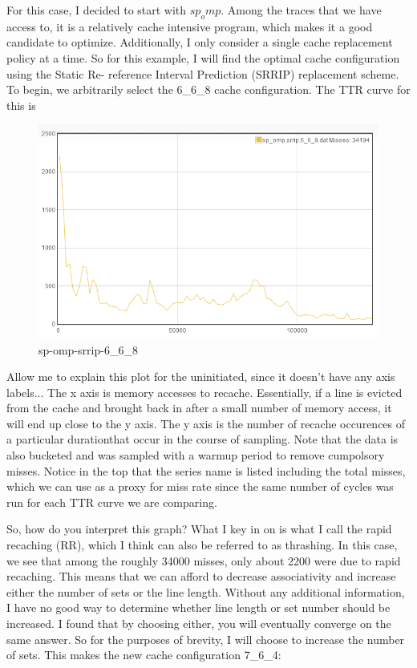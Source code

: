 For this case, I decided to start with $sp_omp$. Among the traces that we have access to, it is a relatively cache intensive program, which makes it a good candidate to optimize. Additionally, I only consider a single cache replacement policy at a time. So for this example, I will find the optimal cache configuration using the Static Re- reference Interval Prediction (SRRIP) replacement scheme. To begin, we arbitrarily select the 
6\_6\_8 
cache configuration. The TTR curve for this is

\begin{figure}
\begin{center}
\includegraphics[width={0.9\columnwidth}]{images/sp_omp-srrip-6_6_8}
\end{center}
\caption{sp-omp-srrip-6\_6\_8}
\label{6_6_8}
\end{figure}

Allow me to explain this plot for the uninitiated, since it doesn't have any axis labels... The x axis is memory accesses to recache. Essentially, if a line is evicted from the cache and brought back in after a small number of memory access, it will end up close to the y axis. The y axis is the number of recache occurences of a particular durationthat occur in the course of sampling. Note that the data is also bucketed and was sampled with a warmup period to remove cumpolsory misses. Notice in the top that the series name is listed including the total misses, which we can use as a proxy for miss rate since the same number of cycles was run for each TTR curve we are comparing.

So, how do you interpret this graph? What I key in on is what I call the rapid recaching (RR), which I think can also be referred to as thrashing. In this case, we see that among the roughly 34000 misses, only about 2200 were due to rapid recaching. This means that we can afford to decrease associativity and increase either the number of sets or the line length. Without any additional information, I have no good way to determine whether line length or set number should be increased. I found that by choosing either, you will eventually converge on the same answer. So for the purposes of brevity, I will choose to increase the number of sets. This makes the new cache configuration 7\_6\_4:

